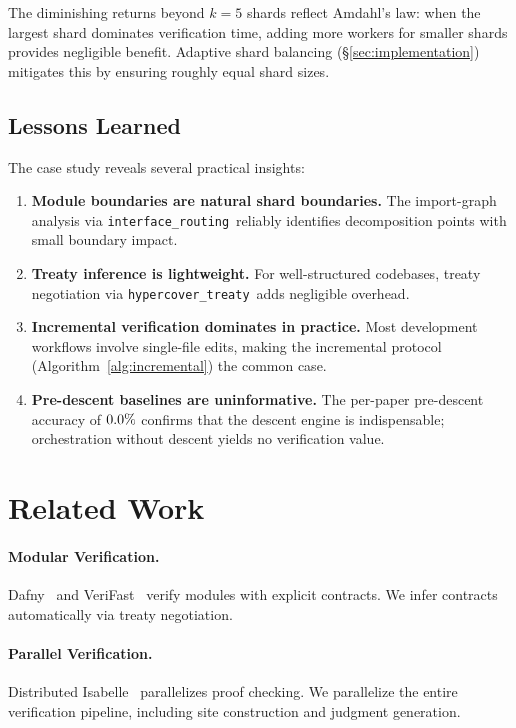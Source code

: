 \documentclass[11pt]{article}
\newcommand{\InterfaceRoute}{\texttt{interface\_routing}}
\newcommand{\HypercoverTreaty}{\texttt{hypercover\_treaty}}
\begin{document}
The diminishing returns beyond $k = 5$ shards reflect Amdahl's law:
when the largest shard dominates verification time, adding more
workers for smaller shards provides negligible benefit.  Adaptive
shard balancing (§\ref{sec:implementation}) mitigates this by
ensuring roughly equal shard sizes.

\subsection{Lessons Learned}

The case study reveals several practical insights:
\begin{enumerate}[noitemsep]
  \item \textbf{Module boundaries are natural shard boundaries.}
        The import-graph analysis via \InterfaceRoute\ reliably
        identifies decomposition points with small boundary impact.
  \item \textbf{Treaty inference is lightweight.}  For well-structured
        codebases, treaty negotiation via \HypercoverTreaty\ adds
        negligible overhead.
  \item \textbf{Incremental verification dominates in practice.}
        Most development workflows involve single-file edits,
        making the incremental protocol
        (Algorithm~\ref{alg:incremental}) the common case.
  \item \textbf{Pre-descent baselines are uninformative.}
        The per-paper pre-descent accuracy of $0.0\%$
        confirms that the descent engine is indispensable; orchestration
        without descent yields no verification value.
\end{enumerate}


\section{Related Work}\label{sec:related}

\paragraph{Modular Verification.}
Dafny~\cite{Leino2010} and VeriFast~\cite{Jacobs2011} verify modules
with explicit contracts.  We infer contracts automatically via treaty
negotiation.

\paragraph{Parallel Verification.}
Distributed Isabelle~\cite{Wenzel2014} parallelizes proof checking.
We parallelize the entire verification pipeline, including site
construction and judgment generation.
\end{document}
